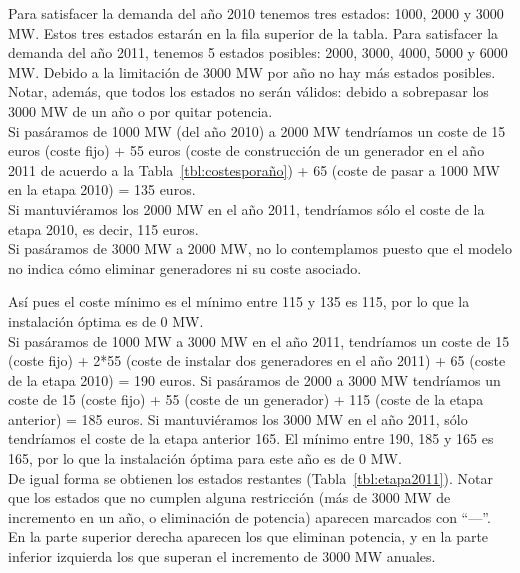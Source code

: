 \documentclass[12pt,a4paper,twoside,openright,titlepage,final]{article}
\begin{document}
Para satisfacer la demanda del año 2010 tenemos tres estados: 1000, 2000 y 3000 MW. Estos tres estados estarán en la fila superior de la tabla. Para satisfacer la demanda del año 2011, tenemos 5 estados posibles: 2000, 3000, 4000, 5000 y 6000 MW. Debido a la limitación de 3000 MW por año no hay más estados posibles. Notar, además, que todos los estados no serán válidos: debido a sobrepasar los 3000 MW de un año o por quitar potencia.\\

Si pasáramos de 1000 MW (del año 2010) a 2000 MW tendríamos un coste de 15 euros (coste fijo) + 55 euros (coste de construcción de un generador en el año 2011 de acuerdo a la Tabla~\ref{tbl:costesporaño}) + 65 (coste de pasar a 1000 MW en la etapa 2010) = 135 euros.\\

Si mantuviéramos los 2000 MW en el año 2011, tendríamos sólo el coste de la etapa 2010, es decir, 115 euros.\\

Si pasáramos de 3000 MW a 2000 MW, no lo contemplamos puesto que el modelo no indica cómo eliminar generadores ni su coste asociado.

Así pues el coste mínimo es el mínimo entre 115 y 135 es 115, por lo que la instalación óptima es de 0 MW.\\

Si pasáramos de 1000 MW a 3000 MW en el año 2011, tendríamos un coste de 15 (coste fijo) + 2*55 (coste de instalar dos generadores en el año 2011) + 65 (coste de la etapa 2010) = 190 euros. Si pasáramos de 2000 a 3000 MW tendríamos un coste de 15 (coste fijo) + 55 (coste de un generador) + 115 (coste de la etapa anterior) = 185 euros. Si mantuviéramos los 3000 MW en el año 2011, sólo tendríamos el coste de la etapa anterior 165. El mínimo entre 190, 185 y 165 es 165, por lo que la instalación óptima para este año es de 0 MW.\\

De igual forma se obtienen los estados restantes (Tabla~\ref{tbl:etapa2011}). Notar que los estados que no cumplen alguna restricción (más de 3000 MW de incremento en un año, o eliminación de potencia) aparecen marcados con ``---''. En la parte superior derecha aparecen los que eliminan potencia, y en la parte inferior izquierda los que superan el incremento de 3000 MW anuales.\\  
\end{document}
